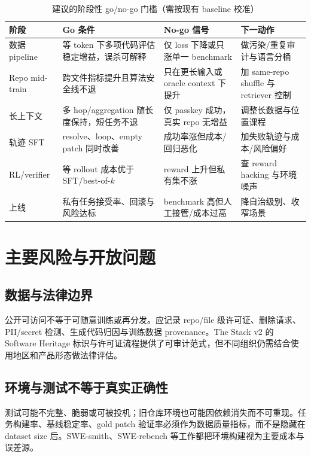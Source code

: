 \documentclass[10pt,a4paper,UTF8,fontset=none]{ctexart}
\begin{document}
\begin{table}[htbp]
\centering
\caption{建议的阶段性 go/no-go 门槛（需按现有 baseline 校准）}
\label{zh:tab:gates}
\small
\begin{tabularx}{\textwidth}{p{2.5cm}YYp{3.2cm}}
\toprule
阶段 & Go 条件 & No-go 信号 & 下一动作 \\
\midrule
数据 pipeline & 等 token 下多项代码评估稳定增益，误杀可解释 & 仅 loss 下降或只涨单一 benchmark & 做污染/重复审计与语言分桶 \\
Repo mid-train & 跨文件指标提升且算法安全线不退 & 只在更长输入或 oracle context 下提升 & 加 same-repo shuffle 与 retriever 控制 \\
长上下文 & 多 hop/aggregation 随长度保持，短任务不退 & 仅 passkey 成功，真实 repo 无增益 & 调整长数据与位置课程 \\
轨迹 SFT & resolve、loop、empty patch 同时改善 & 成功率涨但成本/回归恶化 & 加失败轨迹与成本/风险偏好 \\
RL/verifier & 等 rollout 成本优于 SFT/best-of-$k$ & reward 上升但私有集不涨 & 查 reward hacking 与环境噪声 \\
上线 & 私有任务接受率、回滚与风险达标 & benchmark 高但人工接管/成本过高 & 降自治级别、收窄场景 \\
\bottomrule
\end{tabularx}
\end{table}

\section{主要风险与开放问题}

\subsection{数据与法律边界}

公开可访问不等于可随意训练或再分发。应记录 repo/file 级许可证、删除请求、PII/secret 检测、生成代码归因与训练数据 provenance。The Stack v2 的 Software Heritage 标识与许可证流程提供了可审计范式\cite{zh:lozhkov2024starcoder2}，但不同组织仍需结合使用地区和产品形态做法律评估。

\subsection{环境与测试不等于真实正确性}

测试可能不完整、脆弱或可被投机；旧仓库环境也可能因依赖消失而不可重现。任务构建率、基线稳定率、gold patch 验证率必须作为数据质量指标，而不是隐藏在 dataset size 后。SWE-smith、SWE-rebench 等工作都把环境构建视为主要成本与误差源\cite{zh:yang2025swesmith,zh:badertdinov2025swerebench}。
\end{document}

